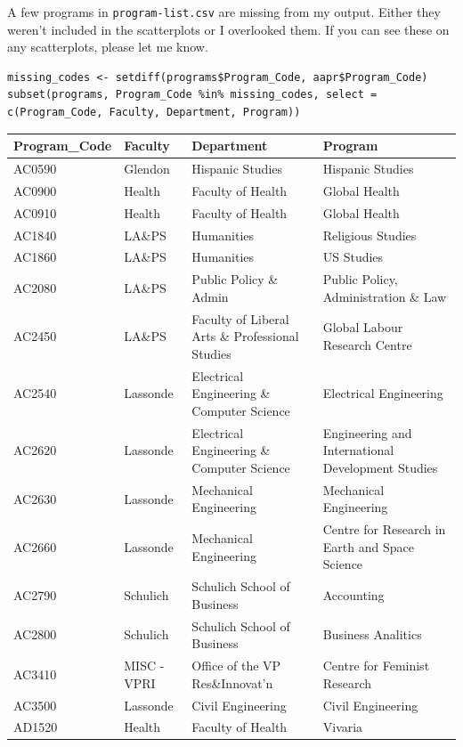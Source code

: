 \documentclass[article,10pt,microtype]{article}
\begin{document}
A few programs in \texttt{program-list.csv} are missing from my output.  Either they weren't included in the scatterplots or I overlooked them.  If you can see these on any scatterplots, please let me know.

\begin{verbatim}
missing_codes <- setdiff(programs$Program_Code, aapr$Program_Code)
subset(programs, Program_Code %in% missing_codes, select = c(Program_Code, Faculty, Department, Program))
\end{verbatim}

\begin{center}
\begin{tabular}{llll}
Program\_Code & Faculty & Department & Program\\
\hline
AC0590 & Glendon & Hispanic Studies & Hispanic Studies\\
AC0900 & Health & Faculty of Health & Global Health\\
AC0910 & Health & Faculty of Health & Global Health\\
AC1840 & LA\&PS & Humanities & Religious Studies\\
AC1860 & LA\&PS & Humanities & US Studies\\
AC2080 & LA\&PS & Public Policy \& Admin & Public Policy, Administration \& Law\\
AC2450 & LA\&PS & Faculty of Liberal Arts \& Professional Studies & Global Labour Research Centre\\
AC2540 & Lassonde & Electrical Engineering \& Computer Science & Electrical Engineering\\
AC2620 & Lassonde & Electrical Engineering \& Computer Science & Engineering and International Development Studies\\
AC2630 & Lassonde & Mechanical Engineering & Mechanical Engineering\\
AC2660 & Lassonde & Mechanical Engineering & Centre for Research in Earth and Space Science\\
AC2790 & Schulich & Schulich School of Business & Accounting\\
AC2800 & Schulich & Schulich School of Business & Business Analitics\\
AC3410 & MISC - VPRI & Office of the VP Res\&Innovat'n & Centre for Feminist Research\\
AC3500 & Lassonde & Civil Engineering & Civil Engineering\\
AD1520 & Health & Faculty of Health & Vivaria\\
\end{tabular}
\end{center}
\end{document}
